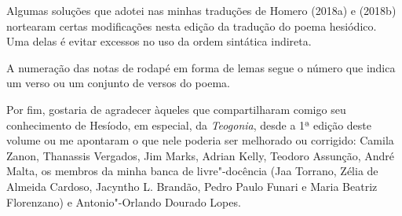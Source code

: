 Algumas soluções que adotei nas minhas traduções de Homero (2018a) e
(2018b) nortearam certas modificações nesta edição da tradução do poema
hesiódico. Uma delas é evitar excessos no uso da ordem sintática
indireta.

A numeração das notas de rodapé em forma de lemas segue o número que
indica um verso ou um conjunto de versos do poema.

Por fim, gostaria de agradecer àqueles que compartilharam comigo seu
conhecimento de Hesíodo, em especial, da \emph{Teogonia}, desde a 1ª
edição deste volume ou me apontaram o que nele poderia ser melhorado ou
corrigido: Camila Zanon, Thanassis Vergados, Jim Marks, Adrian Kelly,
Teodoro Assunção, André Malta, os membros da minha banca de
livre"-docência (Jaa Torrano, Zélia de Almeida Cardoso, Jacyntho L.
Brandão, Pedro Paulo Funari e Maria Beatriz Florenzano) e
Antonio"-Orlando Dourado Lopes.

